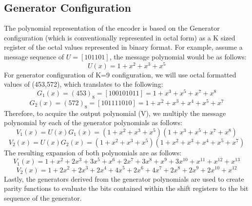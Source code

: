 \documentclass[conference]{IEEEtran}
\begin{document}
 \subsection{Generator Configuration}
 The polynomial representation of the encoder is based on the Generator configuration (which is conventionally represented in octal form) as a K sized register of the octal values represented in binary format. For example, assume a message sequence of $U = [101101]$, the message polynomial would be as follows:
\begin{equation*}
    U(x) = 1 + x^2 + x^3 + x^5
\end{equation*}
For generator configuration of K=9 configuration, we will use octal formatted values of (453,572), which translates to the following:
\begin{equation*}
    G_1(x) = (453)_8 = [100101011] = 1 + x^3 + x^5 + x^7 + x^8
\end{equation*}
\begin{equation*}
    G_2(x) = (572)_8 = [101111010] = 1 + x^2 + x^3 + x^4 + x^5 + x^7
\end{equation*}
Therefore, to acquire the output polynomial (V), we multiply the message polynomial by each of the generator polynomials as follows:
\begin{equation*}
    V_1(x) = U(x)G_1(x) = (1 + x^2 + x^3 + x^5)(1 + x^3 + x^5 + x^7 + x^8)
\end{equation*}
\begin{equation*}
    V_2(x) = U(x)G_2(x) = (1 + x^2 + x^3 + x^5)(1 + x^2 + x^3 + x^4 + x^5 + x^7)
\end{equation*}
The resulting expansion of both polynomials are as follows:
\begin{equation*}
    V_1(x) = 1 + x^2 + 2x^3 + 3x^5 + x^6 + 2x^7 + 3x^8 + x^9 + 3x^{10} + x^{11} + x^{12} + x^{13}
\end{equation*}
\begin{equation*}
    V_2(x) = 1 + 2x^2 + 2x^3 + 2x^4 + 4x^5 + 2x^6 + 4x^7 + 2x^8 + 2x^9 + 2x^{10} + x^{12}
\end{equation*}
Lastly, the generators derived from the generator polynomials are used to create parity functions to evaluate the bits contained within the shift registers to the bit sequence of the generator. 
\end{document}
